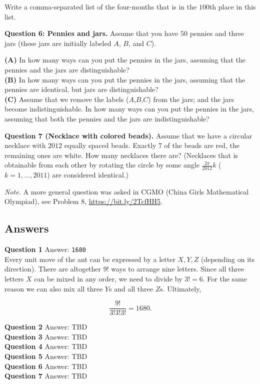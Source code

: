 \documentclass[jou]{apa6}
\begin{document}
Write a comma-separated list of the four-months that is in the $100$th place in this list. 


\vspace{6pt}
{\bf Question 6: Pennies and jars.} 
Assume that you have $50$ pennies and three jars (these jars are initially labeled $A$, $B$, and $C$). 

{\bf (A)} In how many ways can you put the pennies in the jars, assuming that the pennies and the jars are distinguishable?\\
{\bf (B)} In how many ways can you put the pennies in the jars, assuming that the pennies are identical, but jars are distinguishable?\\
{\bf (C)} Assume that we remove the labels ($A$,$B$,$C$) from the jars; and the jars become indistinguishable. 
In how many ways can you put the pennies in the jars, assuming that both the pennies and the jars are indistinguishable?

\vspace{6pt}
{\bf Question 7 (Necklace with colored beads).} Assume that we have a circular necklace with 
$2012$ equally spaced beads. Exactly $7$ of the beads are red, the remaining ones are white. 
How many necklaces there are? (Necklaces that is obtainable from each other by rotating the
circle by some angle $\frac{2\pi}{2012}k$ ($k = 1,\ldots,2011$) are considered identical.)

{\em Note.} A more general question was asked in CGMO (China Girls Mathematical Olympiad), 
see Problem 8, \url{https://bit.ly/2TcfHH5}. 


\newpage
\subsection{Answers}

\vspace{6pt}
{\bf Question 1} Answer: {\tt 1680}\\
Every unit move of the ant can be expressed by a letter $X,Y,Z$ (depending 
on its direction). There are altogether $9!$ ways to arrange 
nine letters. Since all three letters $X$ can be mixed in any order, we need
to divide by $3! = 6$. For the same reason we can also mix all three $Y$s and 
all three $Z$s. Ultimately, 

$$\frac{9!}{3!3!3!} = 1680.$$

\vspace{6pt}
{\bf Question 2} Answer: TBD\\

\vspace{6pt}
{\bf Question 3} Answer: TBD\\

\vspace{6pt}
{\bf Question 4} Answer: TBD\\

\vspace{6pt}
{\bf Question 5} Answer: TBD\\

\vspace{6pt}
{\bf Question 6} Answer: TBD\\

\vspace{6pt}
{\bf Question 7} Answer: TBD\\
\end{document}
